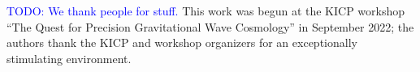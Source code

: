 \documentclass[modern]{aastex631}
\newcommand{\todo}[1]{\textcolor{blue}{TODO: #1}}
\begin{document}
\begin{acknowledgments}
    \todo{We thank people for stuff.}  This work was begun at the KICP workshop
    ``The Quest for Precision Gravitational Wave Cosmology'' in September 2022;
    the authors thank the KICP and workshop organizers for an exceptionally
    stimulating environment.
\end{acknowledgments}


\clearpage


\end{document}
